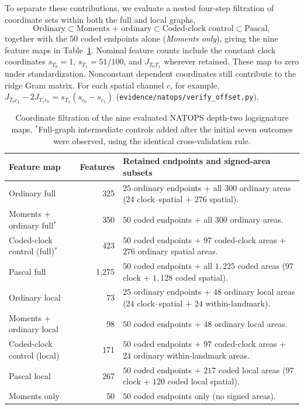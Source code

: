 To separate these contributions, we evaluate a nested four-step filtration of
coordinate sets within both the full and local graphs,
\[
 \text{Ordinary} \subset \text{Moments + ordinary}
 \subset \text{Coded-clock control} \subset \text{Pascal},
\]
together with the \(50\) coded endpoints alone (\emph{Moments only}), giving the
nine feature maps in Table~\ref{tab:natops-maps}. Nominal feature counts include
the constant clock coordinates \(s_{T_0} = 1\), \(s_{T_1} = 51/100\), and
\(J_{T_0 T_1}\) wherever retained. These map to zero under standardization. Nonconstant
dependent coordinates still contribute to the ridge Gram matrix. For each
spatial channel \(c\), for example,
\(J_{T_0 c_1} - 2J_{T_1 c_0} = s_{T_1}(s_{c_0} - s_{c_1})\)
(\nolinkurl{evidence/natops/verify_offset.py}).

\begin{table}[ht]
\centering
\begin{tabular}{@{}lrp{8.4cm}@{}}
\toprule
Feature map & Features & Retained endpoints and signed-area subsets \\
\midrule
Ordinary full & 325 & \(25\) ordinary endpoints \(+\) all \(300\) ordinary areas (\(24\) clock--spatial \(+\) \(276\) spatial). \\
Moments + ordinary full\(^*\) & 350 & \(50\) coded endpoints \(+\) all \(300\) ordinary areas. \\
Coded-clock control (full)\(^*\) & 423 & \(50\) coded endpoints \(+\) \(97\) coded-clock areas \(+\) \(276\) ordinary spatial areas. \\
Pascal full & 1,275 & \(50\) coded endpoints \(+\) all \(1{,}225\) coded areas (\(97\) clock \(+\) \(1{,}128\) coded spatial). \\
\midrule
Ordinary local & 73 & \(25\) ordinary endpoints \(+\) \(48\) ordinary local areas (\(24\) clock--spatial \(+\) \(24\) within-landmark). \\
Moments + ordinary local & 98 & \(50\) coded endpoints \(+\) \(48\) ordinary local areas. \\
Coded-clock control (local) & 171 & \(50\) coded endpoints \(+\) \(97\) coded-clock areas \(+\) \(24\) ordinary within-landmark areas. \\
Pascal local & 267 & \(50\) coded endpoints \(+\) \(217\) coded local areas (\(97\) clock \(+\) \(120\) coded local spatial). \\
\midrule
Moments only & 50 & \(50\) coded endpoints only (no signed areas). \\
\bottomrule
\end{tabular}
\caption{Coordinate filtration of the nine evaluated NATOPS depth-two
logsignature maps. \(^*\)Full-graph intermediate controls added after the initial
seven outcomes were observed, using the identical cross-validation rule.}
\label{tab:natops-maps}
\end{table}


